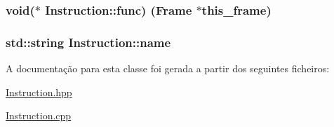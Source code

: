 \subsubsection[{\texorpdfstring{func}{func}}]{\setlength{\rightskip}{0pt plus 5cm}void($\ast$  Instruction\+::func) ({\bf Frame} $\ast$this\+\_\+frame)}\hypertarget{class_instruction_a1f4648eed807151537ef72c78d65081f}{}\label{class_instruction_a1f4648eed807151537ef72c78d65081f}
\subsubsection[{\texorpdfstring{name}{name}}]{\setlength{\rightskip}{0pt plus 5cm}std\+::string Instruction\+::name}\hypertarget{class_instruction_abfd1615a8bb140e70b3724214deee7df}{}\label{class_instruction_abfd1615a8bb140e70b3724214deee7df}


A documentação para esta classe foi gerada a partir dos seguintes ficheiros\+:\begin{DoxyCompactItemize}
\item 
\hyperlink{_instruction_8hpp}{Instruction.\+hpp}\item 
\hyperlink{_instruction_8cpp}{Instruction.\+cpp}\end{DoxyCompactItemize}
